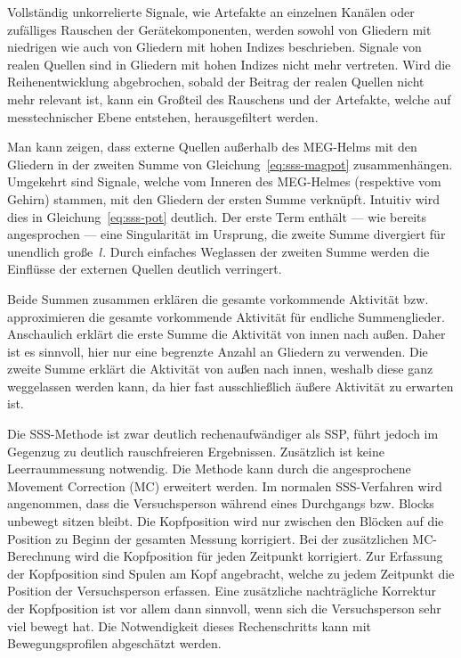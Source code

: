 \documentclass[doc,a4paper,12pt]{apa6}
\begin{document}
\begin{compactitem}
\item Vollständig unkorrelierte Signale, wie Artefakte an einzelnen Kanälen oder zufälliges Rauschen der Gerätekomponenten, werden sowohl von Gliedern mit niedrigen wie auch von Gliedern mit hohen Indizes beschrieben. Signale von realen Quellen sind in Gliedern mit hohen Indizes nicht mehr vertreten. Wird die Reihenentwicklung abgebrochen, sobald der Beitrag der realen Quellen nicht mehr relevant ist, kann ein Großteil des Rauschens und der Artefakte, welche auf messtechnischer Ebene entstehen, herausgefiltert werden.
\item Man kann zeigen, dass externe Quellen außerhalb des MEG-Helms mit den Gliedern in der zweiten Summe von Gleichung~\ref{eq:sss-magpot} zusammenhängen. Umgekehrt sind Signale, welche vom Inneren des MEG-Helmes (respektive vom Gehirn) stammen, mit den Gliedern der ersten Summe verknüpft. Intuitiv wird dies in Gleichung~\ref{eq:sss-pot} deutlich. Der erste Term enthält --- wie bereits angesprochen --- eine Singularität im Ursprung, die zweite Summe divergiert für unendlich große~$l$. Durch einfaches Weglassen der zweiten Summe werden die Einflüsse der externen Quellen deutlich verringert.
\end{compactitem}

Beide Summen zusammen erklären die gesamte vorkommende Aktivität bzw. approximieren die gesamte vorkommende Aktivität für endliche Summenglieder. Anschaulich erklärt die erste Summe die Aktivität von innen nach außen. Daher ist es sinnvoll, hier nur eine begrenzte Anzahl an Gliedern zu verwenden. Die zweite Summe erklärt die Aktivität von außen nach innen, weshalb diese ganz weggelassen werden kann, da hier fast ausschließlich äußere Aktivität zu erwarten ist.

Die SSS-Methode ist zwar deutlich rechenaufwändiger als SSP, führt jedoch im Gegenzug zu deutlich rauschfreieren Ergebnissen. Zusätzlich ist keine Leerraummessung notwendig. Die Methode kann durch die angesprochene Movement Correction (MC) erweitert werden. Im normalen SSS-Verfahren wird angenommen, dass die Versuchsperson während eines Durchgangs bzw. Blocks unbewegt sitzen bleibt. Die Kopfposition wird nur zwischen den Blöcken auf die Position zu Beginn der gesamten Messung korrigiert. Bei der zusätzlichen MC-Berechnung wird die Kopfposition für jeden Zeitpunkt korrigiert. Zur Erfassung der Kopfposition sind Spulen am Kopf angebracht, welche zu jedem Zeitpunkt die Position der Versuchsperson erfassen. Eine zusätzliche nachträgliche Korrektur der Kopfposition ist vor allem dann sinnvoll, wenn sich die Versuchsperson sehr viel bewegt hat. Die Notwendigkeit dieses Rechenschritts kann mit Bewegungsprofilen abgeschätzt werden.
\end{document}
